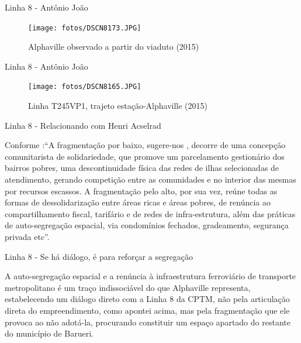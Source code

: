\documentclass[spectratio=169, portuguese]{beamer}
\begin{document}

\begin{frame}{Linha 8 - Antônio João}
	
		\begin{figure}[h]
			\caption{Alphaville observado a partir do viaduto (2015)}
			\texttt{[image: fotos/DSCN8173.JPG]}
		\end{figure}
	
\end{frame}


\begin{frame}{Linha 8 - Antônio João}
	
	\begin{figure}[h]
		\caption{Linha T245VP1, trajeto estação-Alphaville (2015)}
		\texttt{[image: fotos/DSCN8165.JPG]}
	\end{figure}
	
\end{frame}


\begin{frame}{Linha 8 - Relacionando com Henri Acselrad}
	
	Conforme :``A fragmentação por baixo, sugere-nos , decorre de uma concepção comunitarista de solidariedade, que promove um parcelamento gestionário dos bairros pobres, uma descontinuidade física das redes de ilhas selecionadas de atendimento, gerando competição entre as comunidades e no interior das mesmas por recursos escassos. A fragmentação pelo alto, por sua vez, reúne todas as formas de dessolidarização entre áreas ricas e áreas pobres, de renúncia ao compartilhamento fiscal, tarifário e de redes de infra-estrutura, além das práticas de auto-segregação espacial, via condomínios fechados, gradeamento, segurança privada etc''.

\end{frame}


\begin{frame}{Linha 8 - Se há diálogo, é para reforçar a segregação}
	
	A auto-segregação espacial e a renúncia à infraestrutura ferroviário de transporte metropolitano é um traço indissociável do que Alphaville representa, estabelecendo um diálogo direto com a Linha 8 da CPTM, não pela articulação direta do empreendimento, como apontei acima, mas pela fragmentação que ele provoca ao não adotá-la, procurando constituir um espaço apartado do restante do município de Barueri.

\end{frame}
\end{document}
